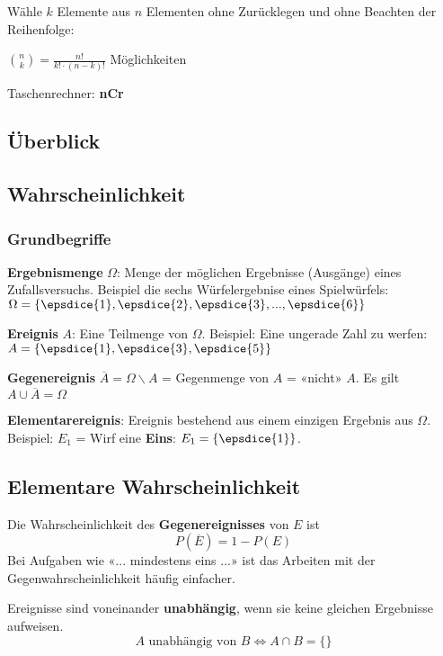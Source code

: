 \begin{multicols}{2}
Wähle $k$ Elemente aus $n$ Elementen ohne Zurücklegen und ohne
Beachten der Reihenfolge:

 ${n\choose k} = \frac{n!}{k!\cdot{}(n-k)!}$ Möglichkeiten

Taschenrechner: \textbf{nCr}



\end{multicols}




\subsection*{Überblick}
\hrulefill


\begin{multicols}{2}


\subsection{Wahrscheinlichkeit}
\subsubsection{Grundbegriffe}

\textbf{Ergebnismenge} $\Omega$: Menge der möglichen Ergebnisse
(Ausgänge) eines Zufallsversuchs. Beispiel die sechs Würfelergebnise
eines Spielwürfels: $\Omega = \{\epsdice{1}, \epsdice{2}, \epsdice{3},
..., \epsdice{6}\}$

\textbf{Ereignis} $A$: Eine Teilmenge von $\Omega$. Beispiel: Eine
ungerade Zahl zu werfen: $A  = \{\epsdice{1}, \epsdice{3}, \epsdice{5}\}$

\textbf{Gegenereignis} $\overline{A} = \Omega \backslash A$ =
Gegenmenge von $A$ = «nicht» $A$. Es gilt $A \cup \overline{A} = \Omega$

\textbf{Elementarereignis}: Ereignis bestehend aus einem einzigen
Ergebnis aus $\Omega$. Beispiel: $E_1$ = Wirf eine \textbf{Eins}: $E_1
= \{\epsdice{1}\}$.


\subsection{Elementare Wahrscheinlichkeit}
Die Wahrscheinlichkeit des \textbf{Gegenereignisses} von $E$ ist
$$P(\overline{E}) = 1- P(E)$$
Bei Aufgaben wie «... mindestens eins ...» ist das Arbeiten mit der
Gegenwahrscheinlichkeit häufig einfacher.

Ereignisse sind voneinander \textbf{unabhängig}, wenn sie keine
gleichen Ergebnisse aufweisen.
$$A \textrm{ unabhängig von } B \Leftrightarrow A\cap B=\{\}$$


\end{multicols}
